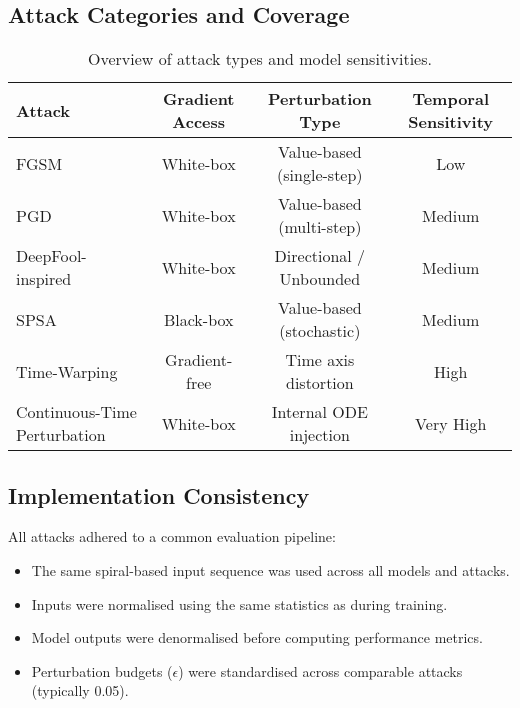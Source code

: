 \subsection{Attack Categories and Coverage}
\begin{table}[H]
\centering
\begin{tabular}{|l|c|c|c|}
\hline
\textbf{Attack} & \textbf{Gradient Access} & \textbf{Perturbation Type} & \textbf{Temporal Sensitivity} \\
\hline
FGSM & White-box & Value-based (single-step) & Low \\
PGD & White-box & Value-based (multi-step) & Medium \\
DeepFool-inspired & White-box & Directional / Unbounded & Medium \\
SPSA & Black-box & Value-based (stochastic) & Medium \\
Time-Warping & Gradient-free & Time axis distortion & High \\
Continuous-Time Perturbation & White-box & Internal ODE injection & Very High \\
\hline
\end{tabular}
\caption{Overview of attack types and model sensitivities.}
\label{tab:attack_summary}
\end{table}

\subsection{Implementation Consistency}
All attacks adhered to a common evaluation pipeline:
\begin{itemize}
    \item The same spiral-based input sequence was used across all models and attacks.
    \item Inputs were normalised using the same statistics as during training.
    \item Model outputs were denormalised before computing performance metrics.
    \item Perturbation budgets ($\epsilon$) were standardised across comparable attacks (typically 0.05).
\end{itemize}

